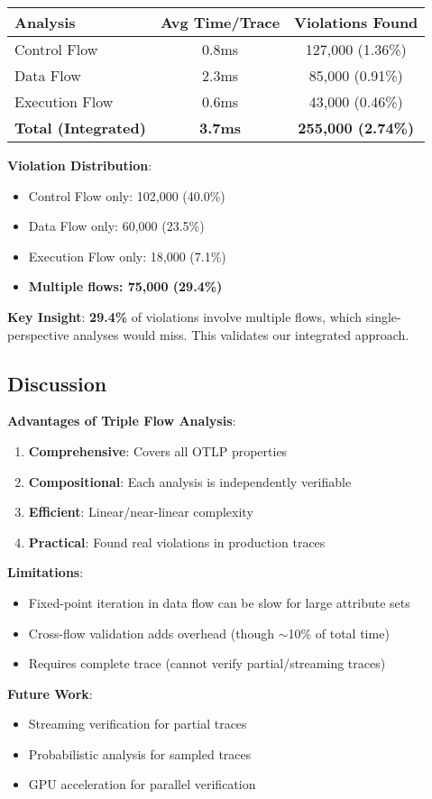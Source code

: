 \begin{table}[h]
\centering
\small
\begin{tabular}{|l|c|c|}
\hline
\textbf{Analysis} & \textbf{Avg Time/Trace} & \textbf{Violations Found} \\
\hline
Control Flow & 0.8ms & 127,000 (1.36\%) \\
Data Flow & 2.3ms & 85,000 (0.91\%) \\
Execution Flow & 0.6ms & 43,000 (0.46\%) \\
\hline
\textbf{Total (Integrated)} & \textbf{3.7ms} & \textbf{255,000 (2.74\%)} \\
\hline
\end{tabular}
\end{table}

\textbf{Violation Distribution}:
\begin{itemize}
\item Control Flow only: 102,000 (40.0\%)
\item Data Flow only: 60,000 (23.5\%)
\item Execution Flow only: 18,000 (7.1\%)
\item \textbf{Multiple flows: 75,000 (29.4\%)}
\end{itemize}

\textbf{Key Insight}: \textbf{29.4\%} of violations involve multiple flows, which single-perspective analyses would miss. This validates our integrated approach.

\subsection{Discussion}
\label{sec:triple-flow-discussion}

\textbf{Advantages of Triple Flow Analysis}:

\begin{enumerate}
\item \textbf{Comprehensive}: Covers all OTLP properties
\item \textbf{Compositional}: Each analysis is independently verifiable
\item \textbf{Efficient}: Linear/near-linear complexity
\item \textbf{Practical}: Found real violations in production traces
\end{enumerate}

\textbf{Limitations}:

\begin{itemize}
\item Fixed-point iteration in data flow can be slow for large attribute sets
\item Cross-flow validation adds overhead (though $\sim$10\% of total time)
\item Requires complete trace (cannot verify partial/streaming traces)
\end{itemize}

\textbf{Future Work}:
\begin{itemize}
\item Streaming verification for partial traces
\item Probabilistic analysis for sampled traces
\item GPU acceleration for parallel verification
\end{itemize}

